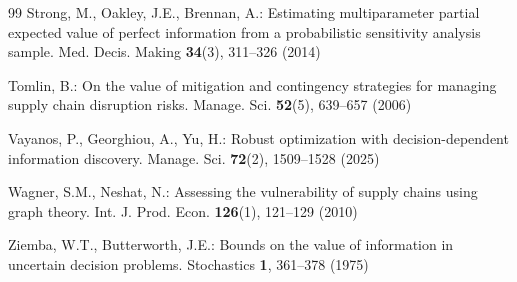 \documentclass[pdflatex,sn-mathphys-num]{sn-jnl}
\theoremstyle{thmstyleone}
\theoremstyle{thmstyletwo}
\theoremstyle{thmstylethree}
\begin{document}
\begin{thebibliography}{99}
Strong, M., Oakley, J.E., Brennan, A.: Estimating multiparameter partial
expected value of perfect information from a probabilistic sensitivity
analysis sample. Med. Decis. Making \textbf{34}(3), 311--326 (2014)

Tomlin, B.: On the value of mitigation and contingency strategies for
managing supply chain disruption risks. Manage. Sci. \textbf{52}(5),
639--657 (2006)

Vayanos, P., Georghiou, A., Yu, H.: Robust optimization with
decision-dependent information discovery. Manage. Sci. \textbf{72}(2),
1509--1528 (2025)

Wagner, S.M., Neshat, N.: Assessing the vulnerability of supply chains using
graph theory. Int. J. Prod. Econ. \textbf{126}(1), 121--129 (2010)

Ziemba, W.T., Butterworth, J.E.: Bounds on the value of information in
uncertain decision problems. Stochastics \textbf{1}, 361--378 (1975)

\end{thebibliography}
\end{document}

